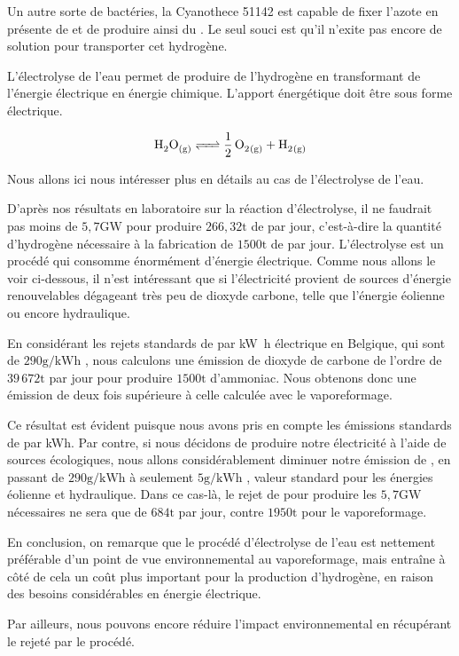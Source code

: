 \documentclass[a4paper, oneside, 12pt]{article}
\begin{document}
Un autre sorte de bactéries, la Cyanothece 51142 est capable de fixer l'azote en présente de  et de produire ainsi du . Le seul souci est qu'il n'exite pas encore de solution pour transporter cet hydrogène.
\newline

L'électrolyse de l'eau permet de produire de l'hydrogène 
en transformant de l'énergie électrique en énergie chimique.
L'apport énergétique doit être sous forme électrique.

\[ \ce{H2O_{(g)} <=> \frac{1}{2} \, O2_{(g)} + H2_{(g)}} \]

Nous allons ici nous intéresser plus en détails au cas de l'électrolyse de l'eau. 

D'après nos résultats en laboratoire sur la réaction d'électrolyse, 
il ne faudrait pas moins de $5,7 \si{\giga\watt}$ 
pour produire $266,32\si{\tonne}$ de  par jour, 
c'est-à-dire la quantité d'hydrogène nécessaire 
à la fabrication de $1500\si{\tonne}$ de  par jour. 
L'électrolyse est un procédé qui consomme énormément d'énergie électrique. 
Comme nous allons le voir ci-dessous, il n'est intéressant que si 
l'électricité provient de sources d'énergie renouvelables dégageant 
très peu de dioxyde carbone, telle que l'énergie éolienne ou encore hydraulique.

En considérant les rejets standards de  par \si{\kilo\watt\hour} électrique 
en Belgique, qui sont de $290\si{\gram/\kilo\watt\hour}$ 
\cite{co2_europe},
nous calculons une émission de dioxyde de carbone de l'ordre de $39 \, 672\si{\tonne}$
par jour pour produire $1500\si{\tonne}$ d'ammoniac. 
Nous obtenons donc une émission de  deux fois 
supérieure à celle calculée avec le vaporeformage.

Ce résultat est évident puisque nous avons pris en compte 
les émissions standards de  par kWh.
Par contre, si nous décidons de produire notre électricité à l'aide de sources écologiques,
nous allons considérablement diminuer notre émission de , 
en passant de $290\si{\gram/\kilo\watt\hour}$ à seulement $5\si{\gram/\kilo\watt\hour}$ 
\cite{energie}, 
valeur standard pour les énergies éolienne et hydraulique. 
Dans ce cas-là, le rejet de  pour produire les $5,7\si{\giga\watt}$ nécessaires 
ne sera que de $684\si{\tonne}$ par jour, 
contre $1950\si{\tonne}$ pour le vaporeformage. 
\newline

En conclusion, on remarque que le procédé d'électrolyse de l'eau 
est nettement préférable d'un point de vue environnemental au vaporeformage, 
mais entraîne à côté de cela un coût plus important pour la production d'hydrogène,
en raison des besoins considérables en énergie électrique.

Par ailleurs, nous pouvons encore réduire l'impact environnemental en récupérant le  rejeté par le procédé.

\printbibliography
\end{document}
